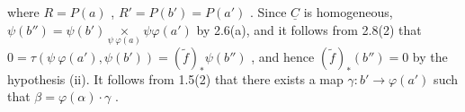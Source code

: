 \begin{center}
\end{center}
where  $R = P(a)$ , $R' = P(b') = P(a')$ . Since $\underline{C}$ is homogeneous, $\psi(b'') = \psi(b') \underset{\psi\ \varphi(a)}{\times} \psi\varphi(a')$ by 2.6(a), and it follows from 2.8(2) that $0 = \tau(\psi\ \varphi(a'), \psi(b')) = (\widetilde{f})_{*}\psi(b'')$ , and hence $(\widetilde{f})_{*}(b'') = 0$ by the hypothesis (ii). It follows from 1.5(2) that there exists a map $\gamma : b' \longrightarrow \varphi(a')$ such that $\beta = \varphi(\alpha)\cdot\gamma$ .

